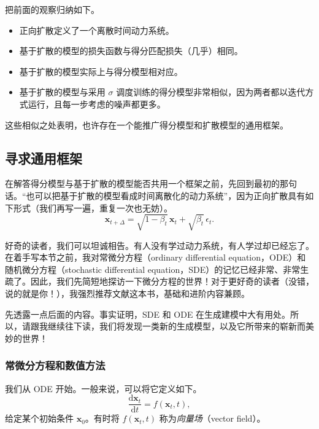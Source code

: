 把前面的观察归纳如下。
\begin{itemize}
  \item 正向扩散定义了一个离散时间动力系统。
  \item 基于扩散的模型的损失函数与得分匹配损失（几乎）相同。
  \item 基于扩散的模型实际上与得分模型相对应。
  \item 基于扩散的模型与采用 $\sigma$ 调度训练的得分模型非常相似，因为两者都以迭代方式运行，且每一步考虑的噪声都更多。
\end{itemize}
这些相似之处表明，也许存在一个能推广得分模型和扩散模型的通用框架。

\subsection{寻求通用框架}

在解答得分模型与基于扩散的模型能否共用一个框架之前，先回到最初的那句话。“也可以把基于扩散的模型看成时间离散化的动力系统”，因为正向扩散具有如下形式（我们再写一遍，重复一次也无妨）。
\begin{equation}
  \mathbf x_{t+\Delta}=\sqrt{1-\beta_t}\,\mathbf x_t+\sqrt{\beta_t}\,\epsilon_t.
  \tag{9.20}\label{eq:09-20}
\end{equation}

好奇的读者，我们可以坦诚相告。有人没有学过动力系统，有人学过却已经忘了。在着手写本节之前，我对常微分方程（ordinary differential equation，ODE）和随机微分方程（stochastic differential equation，SDE）的记忆已经非常、非常生疏了。因此，我们先简短地探访一下微分方程的世界！对于更好奇的读者（没错，说的就是你！），我强烈推荐文献这本书，基础和进阶内容兼顾。

先透露一点后面的内容。事实证明，SDE 和 ODE 在生成建模中大有用处。所以，请跟我继续往下读，我们将发现一类新的生成模型，以及它所带来的崭新而美妙的世界！

\subsubsection{常微分方程和数值方法}

我们从 ODE 开始。一般来说，可以将它定义如下。
\begin{equation}
  \frac{\mathrm d\mathbf x_t}{\mathrm dt}=f(\mathbf x_t,t),
  \tag{9.21}\label{eq:09-21}
\end{equation}
给定某个初始条件 $\mathbf x_0$。有时将 $f(\mathbf x_t,t)$ 称为\emph{向量场}（vector field）。

